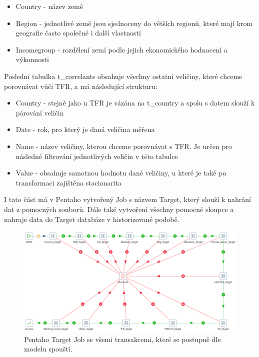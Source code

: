 \documentclass[thesis=M,czech]{FITthesis}[2022/10/08]
\begin{document}
\begin{itemize}
    \item Country - název země
    \item Region - jednotlivé země jsou sjednoceny do větších regionů, které mají krom geografie často společné i další vlastnosti
    \item Incomegroup - rozdělení zemí podle jejich ekonomického hodnocení a výkonnosti
\end{itemize}


Poslední tabulka t\_correlants obsahuje všechny ostatní veličiny, které chceme porovnávat vůči TFR, a má následující strukturu:

\begin{itemize}
    \item Country - stejně jako u TFR je vázána na t\_country a spolu s datem slouží k párování veličin
    \item Date - rok, pro který je daná veličina měřena
    \item Name - název veličiny, kterou chceme porovnávat s TFR. Je určen pro následné filtrování jednotlivých veličin v této tabulce
    \item Value - obsahuje samotnou hodnotu dané veličiny, u které je také po transformaci zajištěna stacionarita
\end{itemize}



I tato část má v Pentaho vytvořený Job s názvem Target, který slouží k nahrání dat z pomocných souborů. Dále také vytvoření všechny pomocné sloupce a nahraje data do Target databáze v historizované podobě. 

\begin{figure}
    \centering
    \includegraphics[width=\textwidth]{DP-obrazky/Target_Pentaho.png}
    \caption{Pentaho Target Job se všemi transakcemi, které se postupně dle modelu spouští.}
    \label{fig:Target_ETL}
\end{figure}
\end{document}
